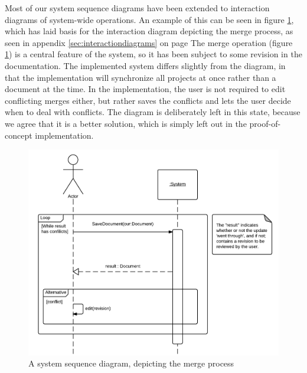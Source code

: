 Most of our system sequence diagrams have been extended to interaction diagrams of system-wide operations. 
An example of this can be seen in figure \ref{fig:merge-ssd}, 
which has laid basis for the interaction diagram depicting the merge process, 
as seen in appendix \ref{sec:interactiondiagrams} on page \pageref{fig:interaction-merge-diagram}
The merge operation (figure \ref{fig:merge-ssd}) is a central feature of the \SOP{} 
system, so it has been subject to some revision in the documentation.
The implemented system differs slightly from the diagram, in that the implementation will synchronize all projects at once rather than a document at the time. 
In the implementation, the user is not required to edit conflicting merges either, but rather 
saves the conflicts and lets the user decide when to deal with conflicts.
The diagram is deliberately left in this state, because we agree that it is a better solution, which is simply left out in the proof-of-concept \SOP{} implementation.

\begin{figure}[hbt]
	\centering
	\includegraphics[width=1\textwidth]{Software_analysis/graphics/Merge-ssd.png}
	\caption{A system sequence diagram, depicting the merge process}
	\label{fig:merge-ssd}
\end{figure}
